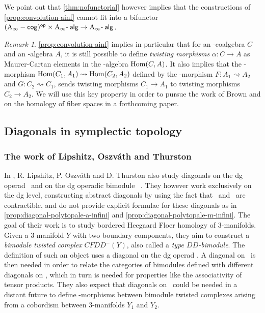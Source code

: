 \documentclass[twoside, 11pt]{amsart}
\theoremstyle{remark}
\newtheorem{remark}[definition]{\sc Remark}
\begin{document}
\noindent We point out that \cref{thm:nofunctorial} however implies that the constructions of \cref{prop:convolution-ainf} cannot fit into a bifunctor $\mathsf{(\mathrm{A}_\infty -cog)^{op}} \times \mathrm{A}_\infty\text{-\hspace{2pt}}\mathsf{alg} \rightarrow \mathrm{A}_\infty\text{-\hspace{2pt}}\mathsf{alg}$.

\begin{remark}
\cref{prop:convolution-ainf} implies in particular that for an \Ainf -coalgebra $C$ and an \Ainf -algebra $A$, it is still possible to define \textit{twisting morphisms} $\alpha : C \rightarrow A$ as Maurer-Cartan elements in the \Ainf -algebra $\mathrm{Hom} (C,A)$.
It also implies that the \Ainf -morphism $\mathrm{Hom} (C_1,A_1) \rightsquigarrow \mathrm{Hom} (C_2,A_2)$ defined by the \Ainf -morphism $F : A_1 \rightsquigarrow A_2$ and $G : C_2 \rightsquigarrow C_1$, sends twisting morphisms $C_1 \rightarrow A_1$ to twisting morphisms $C_2 \rightarrow A_2$.
We will use this key property in order to pursue the work of Brown \cite{Brown59} and \cite{Proute86} on the homology of fiber spaces in a forthcoming paper.
\end{remark}


\subsection{Diagonals in symplectic topology} \label{ss:diag-symp}

\subsubsection{The work of Lipshitz, {Oszv\'ath} and Thurston}

In \cite{LOT20}, R. Lipshitz, P. Oszv\'ath and D. Thurston also study diagonals on the dg operad \Ainf\ and on the dg operadic bimodule \Minf\ . They however work exclusively on the dg level, constructing abstract diagonals by using the fact that \Ainf\ and \Minf\ are contractible, and do not provide explicit formulae for these diagonals as in \cref{prop:diagonal-polytopale-a-infini} and \cref{prop:diagonal-polytopale-m-infini}. The goal of their work is to study bordered Heegaard Floer homology of 3-manifolds.
Given a 3-manifold $Y$ with two boundary components, they aim to construct a \emph{bimodule twisted complex} $CFDD^-(Y)$, also called a \emph{type $DD$-bimodule}. The definition of such an object uses a diagonal on the dg operad \Ainf . A diagonal on \Minf\ is then needed in order to relate the categories of bimodules defined with different diagonals on \Ainf , which in turn is needed for properties like the associativity of tensor products. They also expect that diagonals on \Minf\ could be needed in a distant future to define \Ainf -morphisms between bimodule twisted complexes arising from a cobordism between 3-manifolds $Y_1$ and $Y_2$.
\end{document}
